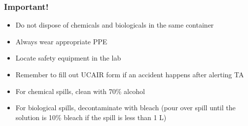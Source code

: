 \documentclass[a4paper, 12pt]{article}
\begin{document}
\subsubsection*{Important!}

\begin{itemize}
\item Do not dispose of chemicals and biologicals in the same container
\item Always wear appropriate PPE
\item Locate safety equipment in the lab
\item Remember to fill out UCAIR form if an accident happens after alerting TA
\item For chemical spills, clean with 70\% alcohol
\item For biological spills, decontaminate with bleach (pour over spill until the solution is 10\% bleach if the spill is less than 1 L)
\end{itemize}
\end{document}
